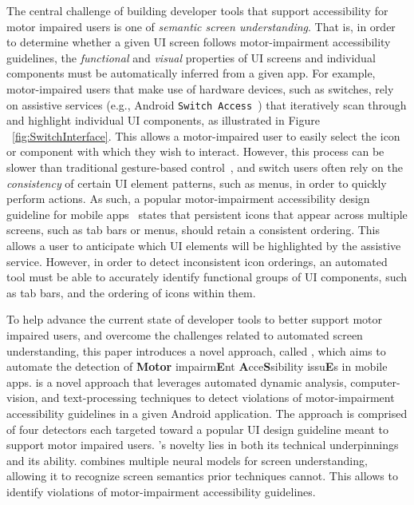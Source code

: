 The central challenge of building developer tools that support accessibility for motor impaired users is one of \textit{semantic screen understanding}. That is, in order to determine whether a given UI screen follows motor-impairment accessibility guidelines, the \textit{functional} and \textit{visual} properties of UI screens and individual components must be automatically inferred from a given app. For example, motor-impaired users that make use of hardware devices, such as switches, rely on assistive services (e.g., Android \texttt{\small Switch Access}~\cite{switch-access}) that iteratively scan through and highlight individual UI components, as illustrated in Figure ~\ref{fig:SwitchInterface}. This allows a motor-impaired user to easily select the icon or component with which they wish to interact. However, this process can be slower than traditional gesture-based control~\cite{MacKenzie11}, and switch users often rely on the \textit{consistency} of certain UI element patterns, such as menus, in order to quickly perform actions. As such, a popular motor-impairment accessibility design guideline for mobile apps~\cite{AppleAccess,GoogleAccess} states that persistent icons that appear across multiple screens, such as tab bars or menus, should retain a consistent ordering. This allows a user to anticipate which UI elements will be highlighted by the assistive service. However, in order to detect inconsistent icon orderings, an automated tool must be able to accurately identify functional groups of UI components, such as tab bars, and the ordering of icons within them. 


To help advance the current state of developer tools to better support motor impaired users, and overcome the challenges related to automated screen understanding, this paper introduces a novel approach, called \MotorEase, which aims to automate the detection of \textbf{Motor} impairm\textbf{E}nt \textbf{A}cce\textbf{S}sibility issu\textbf{E}s in mobile apps. \MotorEase is a novel approach that leverages automated dynamic analysis, computer-vision, and text-processing techniques to detect violations of motor-impairment accessibility guidelines in a given Android application. The approach is comprised of four detectors each targeted toward a popular UI design guideline meant to support motor impaired users. \MotorEase's novelty lies in both its  technical underpinnings and its ability. \MotorEase combines multiple neural models for screen understanding, allowing it to recognize screen semantics prior techniques cannot. This allows \MotorEase to identify violations of motor-impairment accessibility guidelines. 

